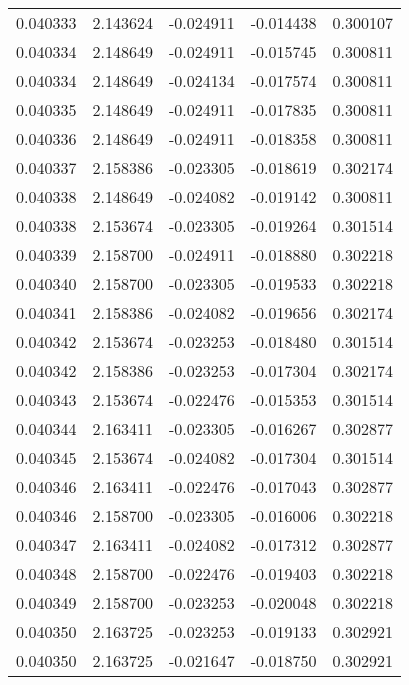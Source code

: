 \begin{tabular}{lrrrr}
0.040333    &  2.143624 & -0.024911 & -0.014438 &             0.300107 \\
0.040334    &  2.148649 & -0.024911 & -0.015745 &             0.300811 \\
0.040334    &  2.148649 & -0.024134 & -0.017574 &             0.300811 \\
0.040335    &  2.148649 & -0.024911 & -0.017835 &             0.300811 \\
0.040336    &  2.148649 & -0.024911 & -0.018358 &             0.300811 \\
0.040337    &  2.158386 & -0.023305 & -0.018619 &             0.302174 \\
0.040338    &  2.148649 & -0.024082 & -0.019142 &             0.300811 \\
0.040338    &  2.153674 & -0.023305 & -0.019264 &             0.301514 \\
0.040339    &  2.158700 & -0.024911 & -0.018880 &             0.302218 \\
0.040340    &  2.158700 & -0.023305 & -0.019533 &             0.302218 \\
0.040341    &  2.158386 & -0.024082 & -0.019656 &             0.302174 \\
0.040342    &  2.153674 & -0.023253 & -0.018480 &             0.301514 \\
0.040342    &  2.158386 & -0.023253 & -0.017304 &             0.302174 \\
0.040343    &  2.153674 & -0.022476 & -0.015353 &             0.301514 \\
0.040344    &  2.163411 & -0.023305 & -0.016267 &             0.302877 \\
0.040345    &  2.153674 & -0.024082 & -0.017304 &             0.301514 \\
0.040346    &  2.163411 & -0.022476 & -0.017043 &             0.302877 \\
0.040346    &  2.158700 & -0.023305 & -0.016006 &             0.302218 \\
0.040347    &  2.163411 & -0.024082 & -0.017312 &             0.302877 \\
0.040348    &  2.158700 & -0.022476 & -0.019403 &             0.302218 \\
0.040349    &  2.158700 & -0.023253 & -0.020048 &             0.302218 \\
0.040350    &  2.163725 & -0.023253 & -0.019133 &             0.302921 \\
0.040350    &  2.163725 & -0.021647 & -0.018750 &             0.302921 \\

\end{tabular}
